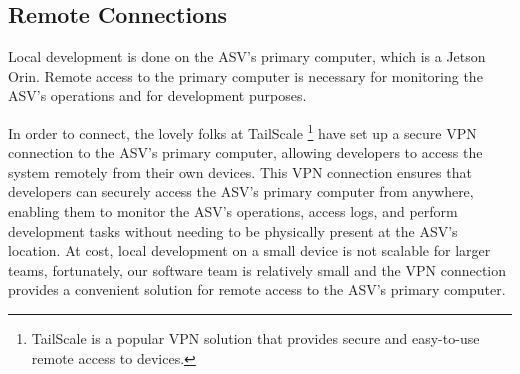 %
%
%
%

\subsection{Remote Connections}
\label{sec:remote-connections}

Local development is done on the ASV's primary computer, which is a Jetson Orin.
Remote access to the primary computer is necessary for monitoring the ASV's operations and for development purposes.

In order to connect, the lovely folks at TailScale
\footnote{TailScale is a popular VPN solution that provides secure and easy-to-use remote access to devices.}
have set up a secure VPN connection to the ASV's primary computer, allowing developers to access the system remotely from their own devices.
This VPN connection ensures that developers can securely access the ASV's primary computer from anywhere, enabling them to monitor the ASV's operations, access logs, and perform development tasks without needing to be physically present at the ASV's location.
At cost, local development on a small device is not scalable for larger teams, fortunately, our software team is relatively small and the VPN connection provides a convenient solution for remote access to the ASV's primary computer.

